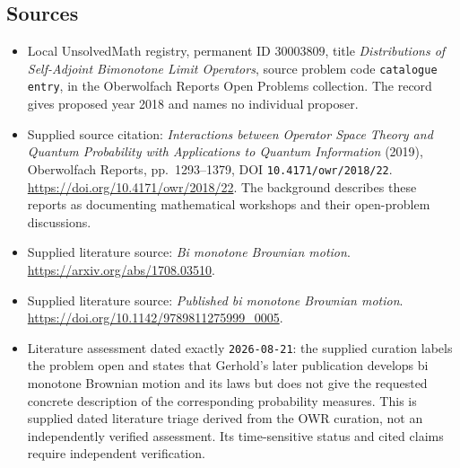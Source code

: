 \documentclass[11pt]{article}
\begin{document}
\subsection{Sources}
\begin{itemize}
\item Local UnsolvedMath registry, permanent ID \(30003809\), title \emph{Distributions of Self-Adjoint Bimonotone Limit Operators}, source problem code \texttt{catalogue entry}, in the Oberwolfach Reports Open Problems collection. The record gives proposed year 2018 and names no individual proposer.
\item Supplied source citation: \emph{Interactions between Operator Space Theory and Quantum Probability with Applications to Quantum Information} (2019), Oberwolfach Reports, pp.\ 1293--1379, DOI \texttt{10.4171/owr/2018/22}. \url{https://doi.org/10.4171/owr/2018/22}. The background describes these reports as documenting mathematical workshops and their open-problem discussions.
\item Supplied literature source: \emph{Bi monotone Brownian motion}. \url{https://arxiv.org/abs/1708.03510}.
\item Supplied literature source: \emph{Published bi monotone Brownian motion}. \url{https://doi.org/10.1142/9789811275999_0005}.
\item Literature assessment dated exactly \texttt{2026-08-21}: the supplied curation labels the problem open and states that Gerhold's later publication develops bi monotone Brownian motion and its laws but does not give the requested concrete description of the corresponding probability measures. This is supplied dated literature triage derived from the OWR curation, not an independently verified assessment. Its time-sensitive status and cited claims require independent verification.
\end{itemize}
\end{document}
